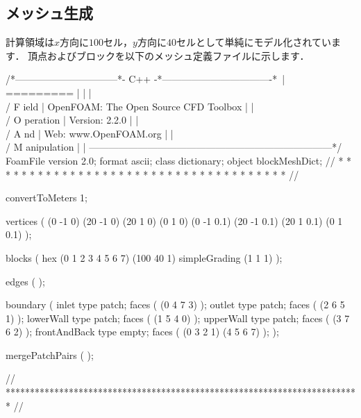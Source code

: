 \subsection{メッシュ生成}
\label{ssec:3.5.2}
計算領域は$x$方向に$100$セル，$y$方向に$40$セルとして単純にモデル化されています．
頂点およびブロックを以下のメッシュ定義ファイルに示します．
\begin{OFverbatim}
/*--------------------------------*- C++ -*----------------------------------*\
| =========                 |                                                 |
| \\      /  F ield         | OpenFOAM: The Open Source CFD Toolbox           |
|  \\    /   O peration     | Version:  2.2.0                                 |
|   \\  /    A nd           | Web:      www.OpenFOAM.org                      |
|    \\/     M anipulation  |                                                 |
\*---------------------------------------------------------------------------*/
FoamFile
{
    version     2.0;
    format      ascii;
    class       dictionary;
    object      blockMeshDict;
}
// * * * * * * * * * * * * * * * * * * * * * * * * * * * * * * * * * * * * * //

convertToMeters 1;

vertices        
(
    (0 -1 0)
    (20 -1 0)
    (20 1 0)
    (0 1 0)
    (0 -1 0.1)
    (20 -1 0.1)
    (20 1 0.1)
    (0 1 0.1)
);

blocks          
(
    hex (0 1 2 3 4 5 6 7) (100 40 1) simpleGrading (1 1 1)
);

edges           
(
);

boundary
(
    inlet
    {
        type patch;
        faces
        (
            (0 4 7 3)
        );
    }
    outlet
    {
        type patch;
        faces
        (
            (2 6 5 1)
        );
    }
    lowerWall
    {
        type patch;
        faces
        (
            (1 5 4 0)
        );
    }
    upperWall
    {
        type patch;
        faces
        (
            (3 7 6 2)
        );
    }
    frontAndBack
    {
        type empty;
        faces
        (
            (0 3 2 1)
            (4 5 6 7)
        );
    }
);

mergePatchPairs
(
);

// ************************************************************************* //
\end{OFverbatim}


